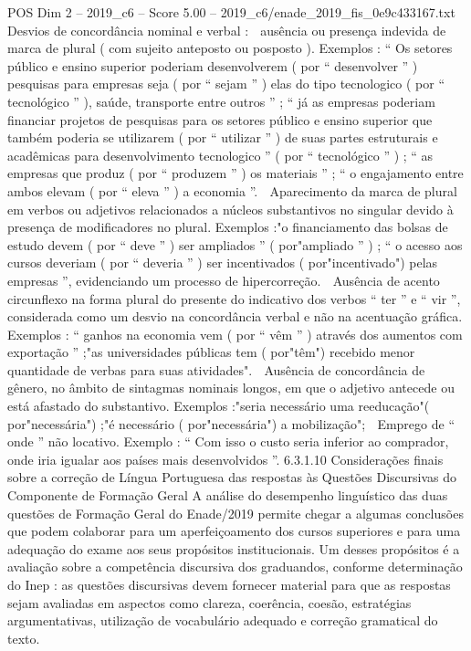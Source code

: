 \begin{textsample}{POS Dim 2 – 2019\_c6 – Score 5.00 – 2019\_c6/enade\_2019\_fis\_0e9c433167.txt}
Desvios de concordância nominal e verbal :  ausência ou presença indevida de marca de plural ( com sujeito anteposto ou posposto ).
Exemplos : “ Os setores público e ensino superior poderiam desenvolverem ( por “ desenvolver ” ) pesquisas para empresas seja ( por “ sejam ” ) elas do tipo tecnologico ( por “ tecnológico ” ), saúde, transporte entre outros ” ; “ já as empresas poderiam financiar projetos de pesquisas para os setores público e ensino superior que também poderia se utilizarem ( por “ utilizar ” ) de suas partes estruturais e acadêmicas para desenvolvimento tecnologico ” ( por “ tecnológico ” ) ; “ as empresas que produz ( por “ produzem ” ) os materiais ” ; “ o engajamento entre ambos elevam ( por “ eleva ” ) a economia ”.  Aparecimento da marca de plural em verbos ou adjetivos relacionados a núcleos substantivos no singular devido à presença de modificadores no plural.
Exemplos :"o financiamento das bolsas de estudo devem ( por “ deve ” ) ser ampliados ” ( por"ampliado ” ) ; “ o acesso aos cursos deveriam ( por “ deveria ” ) ser incentivados ( por"incentivado") pelas empresas ”, evidenciando um processo de hipercorreção.  Ausência de acento circunflexo na forma plural do presente do indicativo dos verbos “ ter ” e “ vir ”, considerada como um desvio na concordância verbal e não na acentuação gráfica.
Exemplos : “ ganhos na economia vem ( por “ vêm ” ) através dos aumentos com exportação ” ;"as universidades públicas tem ( por"têm") recebido menor quantidade de verbas para suas atividades".  Ausência de concordância de gênero, no âmbito de sintagmas nominais longos, em que o adjetivo antecede ou está afastado do substantivo.
Exemplos :"seria necessário uma reeducação"( por"necessária") ;"é necessário ( por"necessária") a mobilização";  Emprego de “ onde ” não locativo.
Exemplo : “ Com isso o custo seria inferior ao comprador, onde iria igualar aos países mais desenvolvidos ”. 6.3.1.10 Considerações finais sobre a correção de Língua Portuguesa das respostas às Questões Discursivas do Componente de Formação Geral A análise do desempenho linguístico das duas questões de Formação Geral do Enade/2019 permite chegar a algumas conclusões que podem colaborar para um aperfeiçoamento dos cursos superiores e para uma adequação do exame aos seus propósitos institucionais.
Um desses propósitos é a avaliação sobre a competência discursiva dos graduandos, conforme determinação do Inep : as questões discursivas devem fornecer material para que as respostas sejam avaliadas em aspectos como clareza, coerência, coesão, estratégias argumentativas, utilização de vocabulário adequado e correção gramatical do texto.

\end{textsample}
